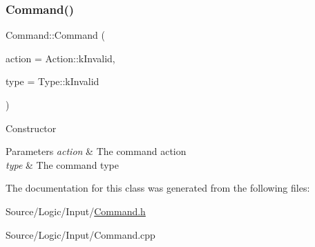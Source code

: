 \subsubsection{\texorpdfstring{Command()}{Command()}}
{\footnotesize\ttfamily Command\+::\+Command (\begin{DoxyParamCaption}\item[{\mbox{\hyperlink{class_command_a45bbda49e9ee96d262ac651fefffe487}{Action}}}]{action = {\ttfamily Action\+:\+:kInvalid},  }\item[{\mbox{\hyperlink{class_command_a4ca33b8d40e12deca5e7bb4190426ee1}{Type}}}]{type = {\ttfamily Type\+:\+:kInvalid} }\end{DoxyParamCaption})}

Constructor 
\begin{DoxyParams}{Parameters}
{\em action} & The command action \\
\hline
{\em type} & The command type \\
\hline
\end{DoxyParams}


The documentation for this class was generated from the following files\+:\begin{DoxyCompactItemize}
\item 
Source/\+Logic/\+Input/\mbox{\hyperlink{_command_8h}{Command.\+h}}\item 
Source/\+Logic/\+Input/Command.\+cpp\end{DoxyCompactItemize}
